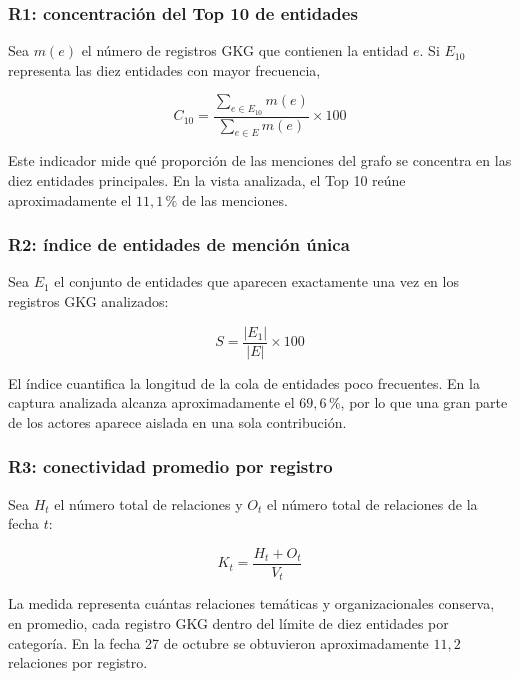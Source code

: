 \documentclass[11pt,a4paper]{article}
\newcommand{\code}[1]{\detokenize{#1}}
\begin{document}
\subsubsection{R1: concentración del Top 10 de entidades}

Sea $m(e)$ el número de registros GKG que contienen la entidad $e$. Si $E_{10}$ representa las diez entidades con mayor frecuencia,

\begin{equation*}
C_{10} = \frac{\sum_{e \in E_{10}} m(e)}{\sum_{e \in E} m(e)} \times 100
\end{equation*}

Este indicador mide qué proporción de las menciones del grafo se concentra en las diez entidades principales. En la vista analizada, el Top 10 reúne aproximadamente el $11{,}1\,\%$ de las menciones.

\subsubsection{R2: índice de entidades de mención única}

Sea $E_1$ el conjunto de entidades que aparecen exactamente una vez en los registros GKG analizados:

\begin{equation*}
S = \frac{|E_1|}{|E|} \times 100
\end{equation*}

El índice cuantifica la longitud de la cola de entidades poco frecuentes. En la captura analizada alcanza aproximadamente el $69{,}6\,\%$, por lo que una gran parte de los actores aparece aislada en una sola contribución.

\subsubsection{R3: conectividad promedio por registro}

Sea $H_t$ el número total de relaciones \code{HAS_THEME} y $O_t$ el número total de relaciones \code{MENTIONS_ORG} de la fecha $t$:

\begin{equation*}
K_t = \frac{H_t + O_t}{V_t}
\end{equation*}

La medida representa cuántas relaciones temáticas y organizacionales conserva, en promedio, cada registro GKG dentro del límite de diez entidades por categoría. En la fecha 27 de octubre se obtuvieron aproximadamente $11{,}2$ relaciones por registro.
\end{document}
